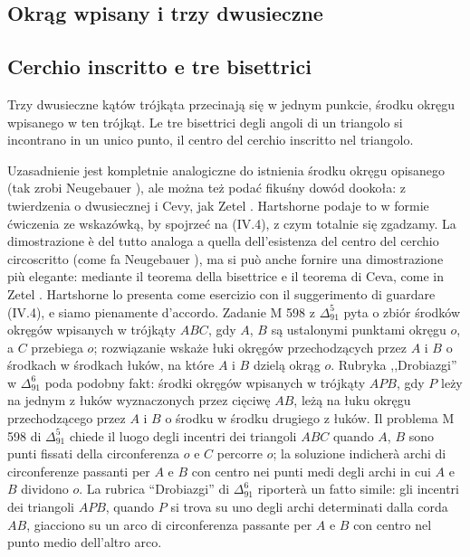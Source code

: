 
%

\subsection{Okrąg wpisany i trzy dwusieczne} %
\subsection{Cerchio inscritto e tre bisettrici} %

\begin{proposition}
    Trzy dwusieczne kątów trójkąta przecinają się w jednym punkcie, środku okręgu wpisanego w ten trójkąt. %
    Le tre bisettrici degli angoli di un triangolo si incontrano in un unico punto, il centro del cerchio inscritto nel triangolo. %
\end{proposition}

Uzasadnienie jest kompletnie analogiczne do istnienia środku okręgu opisanego (tak zrobi Neugebauer \cite[s. 32]{neugebauer_2018}), ale można też podać fikuśny dowód dookoła: z twierdzenia o dwusiecznej i Cevy, jak Zetel \cite[s. 14]{zetel_2020}. %
Hartshorne \cite[s. 16]{hartshorne_2000} podaje to w formie ćwiczenia ze wskazówką, by spojrzeć na (IV.4), z czym totalnie się zgadzamy. %
La dimostrazione è del tutto analoga a quella dell'esistenza del centro del cerchio circoscritto (come fa Neugebauer \cite[p. 32]{neugebauer_2018}), ma si può anche fornire una dimostrazione più elegante: mediante il teorema della bisettrice e il teorema di Ceva, come in Zetel \cite[p. 14]{zetel_2020}. %
Hartshorne \cite[p. 16]{hartshorne_2000} lo presenta come esercizio con il suggerimento di guardare (IV.4), e siamo pienamente d'accordo. %
Zadanie M 598 z $\Delta_{91}^{5}$ pyta o zbiór środków okręgów wpisanych w trójkąty $ABC$, gdy $A$, $B$ są ustalonymi punktami okręgu $o$, a $C$ przebiega $o$; rozwiązanie wskaże łuki okręgów przechodzących przez $A$ i $B$ o środkach w środkach łuków, na które $A$ i $B$ dzielą okrąg $o$. Rubryka ,,Drobiazgi'' w $\Delta_{91}^{6}$ poda podobny fakt: środki okręgów wpisanych w trójkąty $APB$, gdy $P$ leży na jednym z łuków wyznaczonych przez cięciwę $AB$, leżą na łuku okręgu przechodzącego przez $A$ i $B$ o środku w środku drugiego z łuków. %
Il problema M 598 di $\Delta_{91}^{5}$ chiede il luogo degli incentri dei triangoli $ABC$ quando $A$, $B$ sono punti fissati della circonferenza $o$ e $C$ percorre $o$; la soluzione indicherà archi di circonferenze passanti per $A$ e $B$ con centro nei punti medi degli archi in cui $A$ e $B$ dividono $o$. La rubrica ``Drobiazgi'' di $\Delta_{91}^{6}$ riporterà un fatto simile: gli incentri dei triangoli $APB$, quando $P$ si trova su uno degli archi determinati dalla corda $AB$, giacciono su un arco di circonferenza passante per $A$ e $B$ con centro nel punto medio dell'altro arco. %

